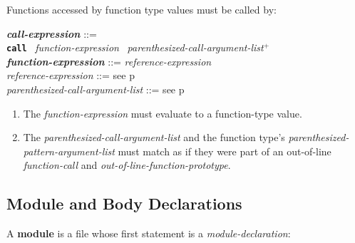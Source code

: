 \documentclass[12pt]{article}
\newcommand{\PLUS}[1][]{{$^{+#1}$}}
\newcommand{\key}[1]{{\rm \bfseries #1}}
\newcommand{\ttkey}[1]{{\tt \bfseries #1}}
\newcommand{\emkey}[1]{{\em \bfseries #1}}
\newcommand{\pagref}[1]{p\pageref{#1}}
\newenvironment{indpar}[1][0.3in]%
	{\begin{list}{}%
		     {\setlength{\itemsep}{0in}%
		      \setlength{\topsep}{0in}%
		      \setlength{\parsep}{1ex}%
		      \setlength{\labelwidth}{#1}%
		      \setlength{\leftmargin}{#1}%
		      \addtolength{\leftmargin}{\labelsep}}%
	 \item}%
	{\end{list}}
\begin{document}
Functions accessed by function type values must be called by:
\begin{indpar}
\emkey{call-expression}\label{CALL-EXPRESSION} ::= \\
\hspace*{0.25in}
	\ttkey{call}~ {\em function-expression}~
	     {\em parenthesized-call-argument-list}\PLUS{}
\\[0.5ex]
\emkey{function-expression} ::= {\em reference-expression}
\\[0.5ex]
{\em reference-expression} ::= see \pagref{REFERENCE-EXPRESSION}
\\[0.5ex]
{\em parenthesized-call-argument-list} ::=
    see \pagref{PARENTHESIZED-CALL-ARGUMENT-LIST}
\begin{enumerate}
\item
The {\em function-expression} must evaluate to
a function-type value.
\item
The {\em parenthesized-call-argument-list} and the function type's
{\em parenthesized-pattern-argument-list} must match
as if they were part of an out-of-line {\em function-call}
and {\em out-of-line-function-prototype}.
\end{enumerate}
\end{indpar}



\subsection{Module and Body Declarations}
\label{MODULE-AND-BODY-DECLARATIONS}

A \key{module} is a file whose first statement is a {\em module-declaration}:
\end{document}
